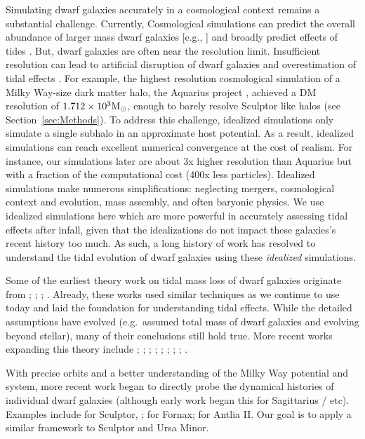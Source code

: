 Simulating dwarf galaxies accurately in a cosmological context remains a
substantial challenge. Currently, Cosmological simulations can predict
the overall abundance of larger mass dwarf galaxies {[}e.g., {]} and
broadly predict effects of tides \citep[e.g.,][]{riley+2024}. But, dwarf
galaxies are often near the resolution limit. Insufficient resolution
can lead to artificial disruption of dwarf galaxies and overestimation
of tidal effects \citep[e.g.,][]{santos-santos+2024}. For example, the
highest resolution cosmological simulation of a Milky Way-size dark
matter halo, the Aquarius project \citep{springel+2008}, achieved a DM
resolution of \(1.712 \times10^3 {\rm M}_{\odot}\), enough to barely resolve
Sculptor like halos (see Section~\ref{sec:Methods}). To address this
challenge, idealized simulations only simulate a single subhalo in an
approximate host potential. As a result, idealized simulations can reach
excellent numerical convergence at the cost of realism. For instance,
our simulations later are about 3x higher resolution than Aquarius but
with a fraction of the computational cost (400x less particles).
Idealized simulations make numerous simplifications: neglecting mergers,
cosmological context and evolution, mass assembly, and often baryonic
physics. We use idealized simulations here which are more powerful in
accurately assessing tidal effects after infall, given that the
idealizations do not impact these galaxies's recent history too much. As
such, a long history of work has resolved to understand the tidal
evolution of dwarf galaxies using these \emph{idealized} simulations.

Some of the earliest theory work on tidal mass loss of dwarf galaxies
originate from \citet{oh+lin+aarseth1995}; \citet{piatek+pryor1995};
\citet{moore+davis1994}; \citet{johnston+spergel+hernquist1995}.
Already, these works used similar techniques as we continue to use today
and laid the foundation for understanding tidal effects. While the
detailed assumptions have evolved (e.g.~assumed total mass of dwarf
galaxies and evolving beyond \citet{king1966} stellar), many of their
conclusions still hold true. More recent works expanding this theory
include \citet{read+2006}; \citet{bullock+johnston2005};
\citet{PNM2008}; \citet{penarrubia+2009}; \citet{klimentowski+2009};
\citet{errani+2023a}; \citet{fattahi+2018}; \citet{stucker+2023};
\citet{wang+2017}.

With precise orbits and a better understanding of the Milky Way
potential and system, more recent work began to directly probe the
dynamical histories of individual dwarf galaxies (although early work
began this for Sagittarius / etc). Examples include \citet{iorio+2019}
for Sculptor, \citet{borukhovetskaya+2022}; \citet{dicintio+2024} for
Fornax; \citet{borukhovetskaya+2022a} for Antlia II. Our goal is to
apply a similar framework to Sculptor and Ursa Minor.


